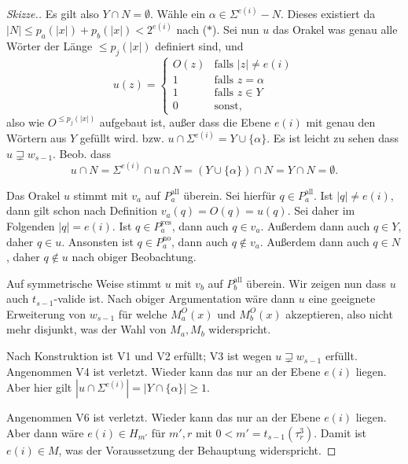 \documentclass[nofonts]{uebung}
\begin{document}
\begin{proof}[Skizze.]
    Es gilt also $Y\cap N =\emptyset$. Wähle ein $\alpha\in \Sigma^{e(i)}-N$. Dieses existiert da $|N|\leq p_a(|x|)+p_b(|x|)<2^{e(i)}$ nach ($\ast$).
    Sei nun $u$ das Orakel was genau alle Wörter der Länge $\leq p_j(|x|)$ definiert sind, und
    \[ u(z)= \begin{cases} O(z) & \text{falls $|z|\neq e(i)$}\\ 1 & \text{falls $z=\alpha$} \\1 & \text{falls $z\in Y$} \\ 0&\text{sonst,} \end{cases}
    \]
    also wie $O^{\leq p_j(|x|)}$ aufgebaut ist, außer dass die Ebene $e(i)$ mit genau den Wörtern aus $Y$ gefüllt wird. bzw. $u\cap\Sigma^{e(i)} = Y\cup \{\alpha\}$.
    Es ist leicht zu sehen dass $u\sqsupsetneq w_{s-1}$.
    Beob. dass 
    \[ u\cap N = \Sigma^{e(i)}\cap u \cap N = (Y\cup \{\alpha\}) \cap N= Y\cap N=\emptyset.\]

    Das Orakel $u$ stimmt mit $v_a$ auf $P^\mathrm{all}_a$ überein. Sei hierfür $q\in P^\mathrm{all}_a$.
    Ist $|q|\neq e(i)$, dann gilt schon nach Definition $v_a(q)=O(q)=u(q)$. Sei daher im Folgenden $|q|=e(i)$.
    Ist $q\in P^\mathrm{yes}_a$, dann auch $q\in v_a$. Außerdem dann auch $q\in Y$, daher $q\in u$.
    Ansonsten ist $q\in P^\mathrm{no}_a$, dann auch $q\not\in v_a$. Außerdem dann auch $q\in N$, daher $q\not\in u$ nach obiger Beobachtung.
    
    Auf symmetrische Weise stimmt $u$ mit $v_b$ auf $P^\mathrm{all}_b$ überein.
    Wir zeigen nun dass $u$ auch $t_{s-1}$-valide ist.
    Nach obiger Argumentation wäre dann $u$ eine geeignete Erweiterung von $w_{s-1}$ für welche $M_a^O(x)$ und $M_b^O(x)$ akzeptieren, also nicht mehr disjunkt, was der Wahl von $M_a, M_b$ widerspricht.

    Nach Konstruktion ist V1 und V2 erfüllt; V3 ist wegen $u\sqsupsetneq w_{s-1}$ erfüllt.
    Angenommen V4 ist verletzt.
    Wieder kann das nur an der Ebene $e(i)$ liegen.
    Aber hier gilt $|u\cap\Sigma^{e(i)}|=|Y\cap\{\alpha\}|\geq 1$.

    Angenommen V6 ist verletzt.
    Wieder kann das nur an der Ebene $e(i)$ liegen.
    Aber dann wäre $e(i)\in H_{m'}$ für $m', r$ mit $0<m'=t_{s-1}(\tau^3_r)$.
    Damit ist $e(i)\in M$, was der Voraussetzung der Behauptung widerspricht.
\end{proof}
\end{document}
